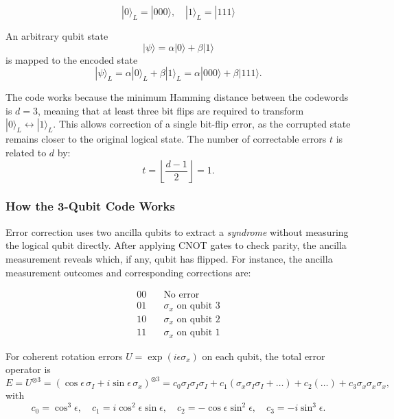 \documentclass[conference]{IEEEtran}
\begin{document}
\begin{equation}
|0\rangle_L = |000\rangle, \quad |1\rangle_L = |111\rangle
\end{equation}

An arbitrary qubit state
\begin{equation}
|\psi\rangle = \alpha |0\rangle + \beta |1\rangle
\end{equation}
is mapped to the encoded state
\begin{equation}
|\psi\rangle_L = \alpha |0\rangle_L + \beta |1\rangle_L = \alpha |000\rangle + \beta |111\rangle.
\end{equation}

The code works because the minimum Hamming distance between the codewords is $d = 3$, meaning that at least three bit flips are required to transform $|0\rangle_L \leftrightarrow |1\rangle_L$. This allows correction of a single bit-flip error, as the corrupted state remains closer to the original logical state. The number of correctable errors $t$ is related to $d$ by:
\begin{equation}
t = \left\lfloor \frac{d-1}{2} \right\rfloor = 1.
\end{equation}

\subsubsection{How the 3-Qubit Code Works}

Error correction uses two ancilla qubits to extract a \textit{syndrome} without measuring the logical qubit directly. After applying CNOT gates to check parity, the ancilla measurement reveals which, if any, qubit has flipped. For instance, the ancilla measurement outcomes and corresponding corrections are:

\begin{equation}
\begin{aligned}
00 &\quad \text{No error} \\
01 &\quad \sigma_x \text{ on qubit 3} \\
10 &\quad \sigma_x \text{ on qubit 2} \\
11 &\quad \sigma_x \text{ on qubit 1}
\end{aligned}
\end{equation}

For coherent rotation errors $U = \exp(i \epsilon \sigma_x)$ on each qubit, the total error operator is
\begin{equation}
E = U^{\otimes 3} = (\cos \epsilon\, \sigma_I + i \sin \epsilon\, \sigma_x)^{\otimes 3} = c_0 \sigma_I \sigma_I \sigma_I + c_1 (\sigma_x \sigma_I \sigma_I + \dots) + c_2 (\dots) + c_3 \sigma_x \sigma_x \sigma_x,
\end{equation}
with
\begin{equation}
c_0 = \cos^3 \epsilon, \quad c_1 = i \cos^2 \epsilon \sin \epsilon, \quad c_2 = -\cos \epsilon \sin^2 \epsilon, \quad c_3 = -i \sin^3 \epsilon.
\end{equation}
\end{document}
